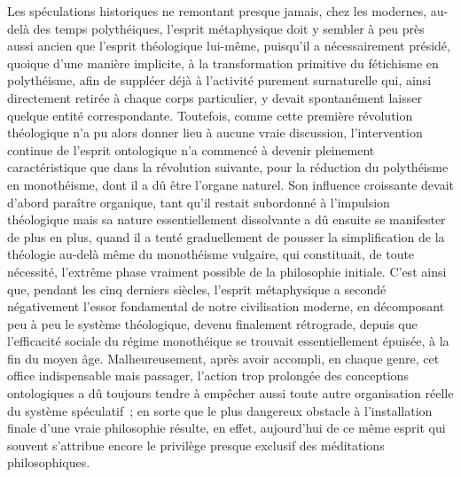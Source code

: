 \documentclass[french,twoside]{book} %
\begin{document}
Les spéculations historiques ne remontant presque jamais, chez les modernes, au-delà des temps polythéiques, l’esprit métaphysique doit y sembler à peu près aussi ancien que l’esprit théologique lui-même, puisqu’il a nécessairement présidé, quoique d’une manière implicite, à la transformation primitive du fétichisme en polythéisme, afin de suppléer déjà à l’activité purement surnaturelle qui, ainsi directement retirée à chaque corps particulier, y devait spontanément laisser quelque entité correspondante. Toutefois, comme cette première révolution théologique n’a pu alors donner lieu à aucune vraie discussion, l’intervention continue de l’esprit ontologique n’a commencé à devenir pleinement caractéristique que dans la révolution suivante, pour la réduction du polythéisme en monothéisme, dont il a dû être l’organe naturel. Son influence croissante devait d’abord paraître organique, tant qu’il restait subordonné à l’impulsion théologique mais sa nature essentiellement dissolvante a dû ensuite se manifester de plus en plus, quand il a tenté graduellement de pousser la simplification de la théologie au-delà même du monothéisme vulgaire, qui constituait, de toute nécessité, l’extrême phase vraiment possible de la philosophie initiale. C’est ainsi que, pendant les cinq derniers siècles, l’esprit métaphysique a secondé négativement l’essor fondamental de notre civilisation moderne, en décomposant peu à peu le système théologique, devenu finalement rétrograde, depuis que l’efficacité sociale du régime monothéique se trouvait essentiellement épuisée, à la fin du moyen âge. Malheureusement, après avoir accompli, en chaque genre, cet office indispensable mais passager, l’action trop prolongée des conceptions ontologiques a dû toujours tendre à empêcher aussi toute autre organisation réelle du système spéculatif ; en sorte que le plus dangereux obstacle à l’installation finale d’une vraie philosophie résulte, en effet, aujourd’hui de ce même esprit qui souvent s’attribue encore le privilège presque exclusif des méditations philosophiques.\par
\end{document}
